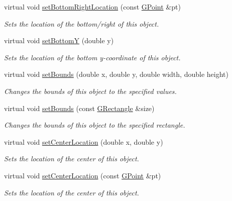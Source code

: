 \begin{DoxyCompactItemize}
virtual void \mbox{\hyperlink{classsgl_1_1GObject_ac6f7320321182f1d18c1c0fa97d5e941}{set\+Bottom\+Right\+Location}} (const \mbox{\hyperlink{structsgl_1_1GPoint}{G\+Point}} \&pt)
\begin{DoxyCompactList}\small\item\em Sets the location of the bottom/right of this object. \end{DoxyCompactList}\item 
virtual void \mbox{\hyperlink{classsgl_1_1GObject_a4b20e93c2a2597484f74ee5caa71f41f}{set\+BottomY}} (double y)
\begin{DoxyCompactList}\small\item\em Sets the location of the bottom y-\/coordinate of this object. \end{DoxyCompactList}\item 
virtual void \mbox{\hyperlink{classsgl_1_1GObject_a2aae8197624b72265ab83b4f1bc73f2f}{set\+Bounds}} (double x, double y, double width, double height)
\begin{DoxyCompactList}\small\item\em Changes the bounds of this object to the specified values. \end{DoxyCompactList}\item 
virtual void \mbox{\hyperlink{classsgl_1_1GObject_acada386653f008cacc7cce86426bef7c}{set\+Bounds}} (const \mbox{\hyperlink{structsgl_1_1GRectangle}{G\+Rectangle}} \&size)
\begin{DoxyCompactList}\small\item\em Changes the bounds of this object to the specified rectangle. \end{DoxyCompactList}\item 
virtual void \mbox{\hyperlink{classsgl_1_1GObject_a290b47dd8de1be44089f95cb2c47c1de}{set\+Center\+Location}} (double x, double y)
\begin{DoxyCompactList}\small\item\em Sets the location of the center of this object. \end{DoxyCompactList}\item 
virtual void \mbox{\hyperlink{classsgl_1_1GObject_a1bedf1b233ecba3f753ec58908a683a6}{set\+Center\+Location}} (const \mbox{\hyperlink{structsgl_1_1GPoint}{G\+Point}} \&pt)
\begin{DoxyCompactList}\small\item\em Sets the location of the center of this object. \end{DoxyCompactList}\item 

\end{DoxyCompactItemize}
